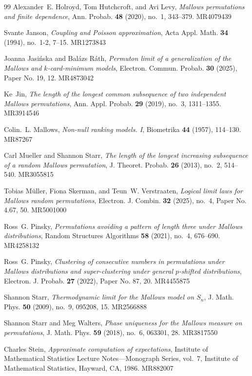 \documentclass[letterpaper,11pt]{article}
\theoremstyle{definition}
\theoremstyle{remark}
\begin{document}
\begin{thebibliography}{99}
	Alexander~E. Holroyd, Tom Hutchcroft, and Avi Levy, \emph{Mallows permutations
		and finite dependence}, Ann. Probab. \textbf{48} (2020), no.~1, 343--379.
	MR{4079439}
	
	Svante Janson, \emph{Coupling and {P}oisson approximation}, Acta Appl. Math.
	\textbf{34} (1994), no.~1-2, 7--15. MR{1273843}
	
	Joanna Jasi\'{n}ska and Bal\'{a}zs R\'{a}th, \emph{Permuton limit of a
		generalization of the {M}allows and {$k$}-card-minimum models}, Electron.
	Commun. Probab. \textbf{30} (2025), Paper No. 19, 12. MR{4873042}
	
	Ke~Jin, \emph{The length of the longest common subsequence of two independent
		{M}allows permutations}, Ann. Appl. Probab. \textbf{29} (2019), no.~3,
	1311--1355. MR{3914546}
	
	Colin.~L. Mallows, \emph{Non-null ranking models. {I}}, Biometrika \textbf{44}
	(1957), 114--130. MR{87267}
	
	Carl Mueller and Shannon Starr, \emph{The length of the longest increasing
		subsequence of a random {M}allows permutation}, J. Theoret. Probab.
	\textbf{26} (2013), no.~2, 514--540. MR{3055815}
	
	Tobias M\"{u}ller, Fiona Skerman, and Teun~W. Verstraaten, \emph{Logical limit
		laws for {M}allows random permutations}, Electron. J. Combin. \textbf{32}
	(2025), no.~4, Paper No. 4.67, 50. MR{5001000}
	
	Ross~G. Pinsky, \emph{Permutations avoiding a pattern of length three under
		{M}allows distributions}, Random Structures Algorithms \textbf{58} (2021),
	no.~4, 676--690. MR{4258132}
	
	Ross~G. Pinsky, \emph{Clustering of consecutive numbers in permutations under
		{M}allows distributions and super-clustering under general {$p$}-shifted
		distributions}, Electron. J. Probab. \textbf{27} (2022), Paper No. 87, 20.
	MR{4455875}
	
	Shannon Starr, \emph{Thermodynamic limit for the {M}allows model on {$S_n$}},
	J. Math. Phys. \textbf{50} (2009), no.~9, 095208, 15. MR{2566888}
	
	Shannon Starr and Meg Walters, \emph{Phase uniqueness for the {M}allows measure
		on permutations}, J. Math. Phys. \textbf{59} (2018), no.~6, 063301, 28.
	MR{3817550}
	
	Charles Stein, \emph{Approximate computation of expectations}, Institute of
	Mathematical Statistics Lecture Notes---Monograph Series, vol.~7, Institute
	of Mathematical Statistics, Hayward, CA, 1986. MR{882007}
	
\end{thebibliography}







%
%
 
\end{document}
